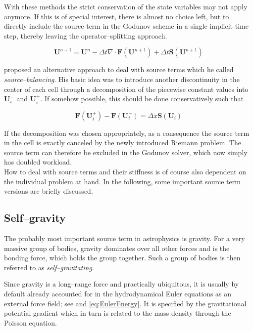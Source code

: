 With these methods the strict conservation of the state variables may not apply anymore.
If this is of special interest, there is almost no choice left, but to directly include the source term in the Godunov scheme in a single implicit time step, thereby leaving the operator--splitting approach.

\begin{equation}
  \textbf{U}^{n+1} = \textbf{U}^{n} - \Delta t \nabla \cdot \textbf{F}(\textbf{U}^{n+1}) + \Delta t \textbf{S}(\textbf{U}^{n+1})
\end{equation}

\citet{LeVeque_source_balancing} proposed an alternative approach to deal with source terms which he called \textit{source--balancing}.
His basic idea was to introduce another discontinuity in the center of each cell through a decomposition of the piecewise constant values into $\textbf{U}_{i}^{-}$ and $\textbf{U}_{i}^{+}$.
If somehow possible, this should be done conservatively such that

\begin{equation}
  \textbf{F}(\textbf{U}_{i}^{+}) - \textbf{F}(\textbf{U}_{i}^{-}) = \Delta x\textbf{S}(\textbf{U}_{i})
\end{equation}

If the decomposition was chosen appropriately, as a consequence the source term in the cell is exactly canceled by the newly introduced Riemann problem.
The source term can therefore be excluded in the Godunov solver, which now simply has doubled workload.
\\[6pt]
%
How to deal with source terms and their stiffness is of course also dependent on the individual problem at hand.
In the following, some important source term versions are briefly discussed.


\subsection{Self--gravity}
\label{subsec:Gravity_source}

The probably most important source term in astrophysics is gravity.
For a very massive group of bodies, gravity dominates over all other forces and is the bonding force, which holds the group together.
Such a group of bodies is then referred to as \textit{self--gravitating}.

Since gravity is a long--range force and practically ubiquitous, it is usually by default already accounted for in the hydrodynamical Euler equations as an external force field; see  and \eqref{eq:EulerEnergy}.
It is specified by the gravitational potential gradient which in turn is related to the mass density through the Poisson equation.

